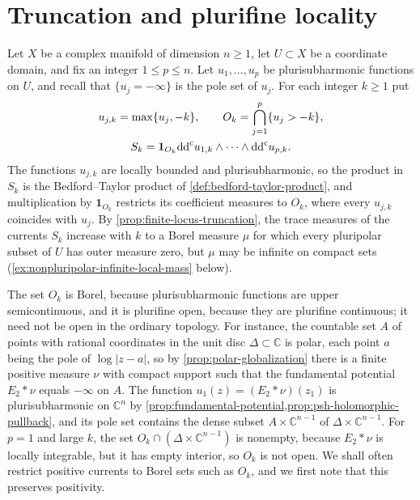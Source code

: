 \section{Truncation and plurifine locality}
\label{sec:nonpluripolar-construction}
Let $X$ be a complex manifold of dimension $n\geq1$, let $U\subset X$ be a coordinate domain, and fix an integer $1\leq p\leq n$. Let $u_1,\ldots,u_p$ be plurisubharmonic functions on $U$, and recall that $\{u_j=-\infty\}$ is the pole set of $u_j$. For each integer $k\geq1$ put
\[
 \begin{gathered}
 u_{j,k}=\max\{u_j,-k\},\qquad
 O_k=\bigcap_{j=1}^p\{u_j>-k\},\\
 S_k=\mathbf1_{O_k}\mathrm{dd}^{\mathrm{c}} u_{1,k}\wedge\cdots\wedge\mathrm{dd}^{\mathrm{c}} u_{p,k}.
 \end{gathered}
\]
The functions $u_{j,k}$ are locally bounded and plurisubharmonic, so the product in $S_k$ is the Bedford--Taylor product of \cref{def:bedford-taylor-product}, and multiplication by $\mathbf1_{O_k}$ restricts its coefficient measures to $O_k$, where every $u_{j,k}$ coincides with $u_j$. By \cref{prop:finite-locus-truncation}, the trace measures of the currents $S_k$ increase with $k$ to a Borel measure $\mu$ for which every pluripolar subset of $U$ has outer measure zero, but $\mu$ may be infinite on compact sets (\cref{ex:nonpluripolar-infinite-local-mass} below).

The set $O_k$ is Borel, because plurisubharmonic functions are upper semicontinuous, and it is plurifine open, because they are plurifine continuous; it need not be open in the ordinary topology. For instance, the countable set $A$ of points with rational coordinates in the unit disc $\Delta\subset\mathbb C$ is polar, each point $a$ being the pole of $\log|z-a|$, so by \cref{prop:polar-globalization} there is a finite positive measure $\nu$ with compact support such that the fundamental potential $E_2*\nu$ equals $-\infty$ on $A$. The function $u_1(z)=(E_2*\nu)(z_1)$ is plurisubharmonic on $\mathbb C^n$ by \cref{prop:fundamental-potential,prop:psh-holomorphic-pullback}, and its pole set contains the dense subset $A\times\mathbb C^{n-1}$ of $\Delta\times\mathbb C^{n-1}$. For $p=1$ and large $k$, the set $O_k\cap(\Delta\times\mathbb C^{n-1})$ is nonempty, because $E_2*\nu$ is locally integrable, but it has empty interior, so $O_k$ is not open. We shall often restrict positive currents to Borel sets such as $O_k$, and we first note that this preserves positivity.

